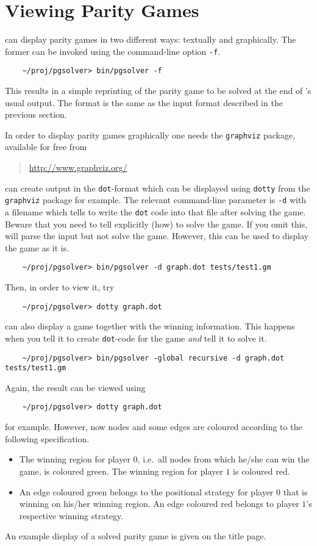 \section{Viewing Parity Games}
\label{sec:viewing}

\pgsolver can display parity games in two different ways: textually and graphically. The former
can be invoked using the command-line option \texttt{-f}.
\begin{verbatim}
    ~/proj/pgsolver> bin/pgsolver -f 
\end{verbatim}
This results in a simple reprinting of the parity game to be solved at the end of \pgsolver's usual
output. The format is the same as the input format described in the previous section.

In order to display parity games graphically one needs the \texttt{graphviz} package, available for
free from
\begin{quotation}
    \url{http://www.graphviz.org/}
\end{quotation}
\pgsolver can create output in the \texttt{dot}-format which can be displayed using \texttt{dotty} from
the \texttt{graphviz} package for example. The relevant command-line parameter is \texttt{-d} with
a filename which tells \pgsolver to write the \texttt{dot} code into that file after solving the game.
Beware that you need to tell \pgsolver explicitly (how) to solve the game. If you omit this, \pgsolver
will parse the input but not solve the game. However, this can be used to display the game as it is.
\begin{verbatim}
    ~/proj/pgsolver> bin/pgsolver -d graph.dot tests/test1.gm
\end{verbatim}
Then, in order to view it, try
\begin{verbatim}
    ~/proj/pgsolver> dotty graph.dot
\end{verbatim}
\pgsolver can also display a game together with the winning information. This happens when you tell it
to create \texttt{dot}-code for the game \emph{and} tell it to solve it.
\begin{verbatim}
    ~/proj/pgsolver> bin/pgsolver -global recursive -d graph.dot tests/test1.gm
\end{verbatim}
Again, the result can be viewed using
\begin{verbatim}
    ~/proj/pgsolver> dotty graph.dot
\end{verbatim}
for example. However, now nodes and some edges are coloured according to the following specification.
\begin{itemize}
\item The winning region for player $0$, i.e.\ all nodes from which he/she can win the game, is coloured 
      green. The winning region for player $1$ is coloured red.
\item An edge coloured green belongs to the positional strategy for player $0$ that is winning on his/her
      winning region. An edge coloured red belongs to player $1$'s respective winning strategy.
\end{itemize}
An example display of a solved parity game is given on the title page.



